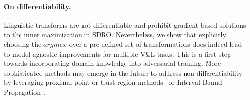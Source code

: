 \paragraph{On differentiability.}
Linguistic transforms are not differentiable and prohibit gradient-based solutions to the inner maximization in SDRO.
Nevertheless, we show that explicitly choosing the $argmax$ over a pre-defined set of transformations does indeed lead to model-agnostic improvements for multiple V\&L tasks.
This is a first step towards incorporating domain knowledge into adversarial training. 
More sophisticated methods may emerge in the future to address non-differentiability by leveraging proximal point or trust-region methods~\citep{eckstein1993nonlinear,conn2000trust} or Interval Bound Propagation~\citep{dvijotham2018dual,jia2019certified}.

